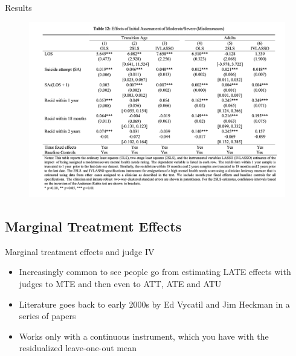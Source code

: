 \documentclass{beamer}
\begin{document}
\begin{frame}{Results}
	\begin{figure}
             \centering
             \includegraphics[scale=0.3]{./lecture_includes/jhr_ivfig6}
	\end{figure}
\end{frame}



\subsection{Marginal Treatment Effects}

\begin{frame}{Marginal treatment effects and judge IV}

\begin{itemize}

\item Increasingly common to see people go from estimating LATE effects with judges to MTE and then even to ATT, ATE and ATU
\item Literature goes back to early 2000s by Ed Vycatil and Jim Heckman in a series of papers
\item Works only with a continuous instrument, which you have with the residualized leave-one-out mean

\end{itemize}

\end{frame}
\end{document}

